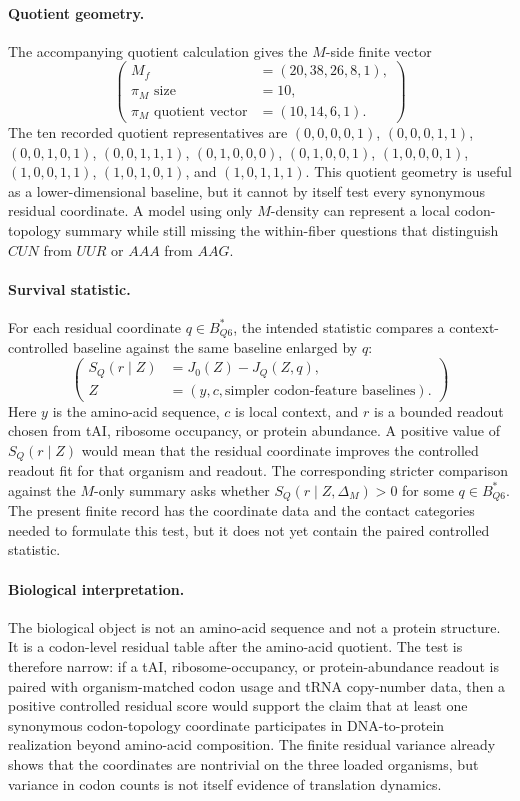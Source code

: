 \paragraph{Quotient geometry.}
The accompanying quotient calculation gives the $M$-side finite vector
$$(\begin{aligned}
M_f&=(20,38,26,8,1),\\
\pi_M\text{ size}&=10,\\
\pi_M\text{ quotient vector}&=(10,14,6,1).
\end{aligned})$$
The ten recorded quotient representatives are $(0,0,0,0,1)$, $(0,0,0,1,1)$, $(0,0,1,0,1)$, $(0,0,1,1,1)$, $(0,1,0,0,0)$, $(0,1,0,0,1)$, $(1,0,0,0,1)$, $(1,0,0,1,1)$, $(1,0,1,0,1)$, and $(1,0,1,1,1)$. This quotient geometry is useful as a lower-dimensional baseline, but it cannot by itself test every synonymous residual coordinate. A model using only $M$-density can represent a local codon-topology summary while still missing the within-fiber questions that distinguish $CUN$ from $UUR$ or $AAA$ from $AAG$.

\paragraph{Survival statistic.}
For each residual coordinate $q\in B^{\ast}_{Q6}$, the intended statistic compares a context-controlled baseline against the same baseline enlarged by $q$:
$$(\begin{aligned}
S_Q(r\mid Z)&=J_0(Z)-J_Q(Z,q),\\
Z&=(y,c,\text{simpler codon-feature baselines}).
\end{aligned})$$
Here $y$ is the amino-acid sequence, $c$ is local context, and $r$ is a bounded readout chosen from tAI, ribosome occupancy, or protein abundance. A positive value of $S_Q(r\mid Z)$ would mean that the residual coordinate improves the controlled readout fit for that organism and readout. The corresponding stricter comparison against the $M$-only summary asks whether $S_Q(r\mid Z,\Delta_M)>0$ for some $q\in B^{\ast}_{Q6}$. The present finite record has the coordinate data and the contact categories needed to formulate this test, but it does not yet contain the paired controlled statistic.

\paragraph{Biological interpretation.}
The biological object is not an amino-acid sequence and not a protein structure. It is a codon-level residual table after the amino-acid quotient. The test is therefore narrow: if a tAI, ribosome-occupancy, or protein-abundance readout is paired with organism-matched codon usage and tRNA copy-number data, then a positive controlled residual score would support the claim that at least one synonymous codon-topology coordinate participates in DNA-to-protein realization beyond amino-acid composition. The finite residual variance already shows that the coordinates are nontrivial on the three loaded organisms, but variance in codon counts is not itself evidence of translation dynamics.

